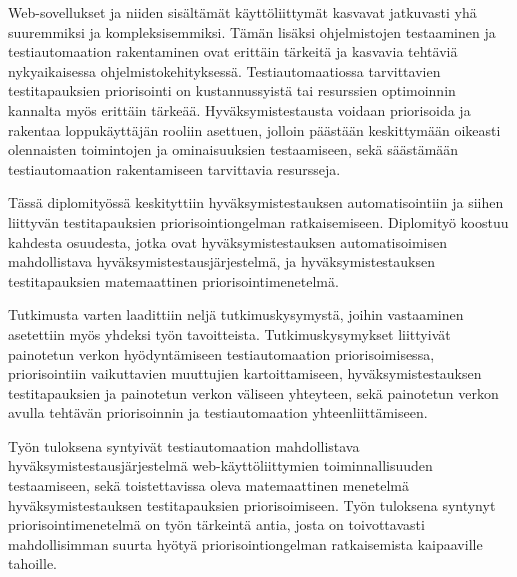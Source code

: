 Web-sovellukset ja niiden sisältämät käyttöliittymät kasvavat jatkuvasti yhä suuremmiksi ja kompleksisemmiksi.
Tämän lisäksi ohjelmistojen testaaminen ja testiautomaation rakentaminen ovat erittäin tärkeitä ja kasvavia tehtäviä nykyaikaisessa ohjelmistokehityksessä.
Testiautomaatiossa tarvittavien testitapauksien priorisointi on kustannussyistä tai resurssien optimoinnin kannalta myös erittäin tärkeää.
Hyväksymistestausta voidaan priorisoida ja rakentaa loppukäyttäjän rooliin asettuen, jolloin päästään keskittymään oikeasti olennaisten toimintojen ja ominaisuuksien testaamiseen, sekä säästämään testiautomaation rakentamiseen tarvittavia resursseja.

Tässä diplomityössä keskityttiin hyväksymistestauksen automatisointiin ja siihen liittyvän testitapauksien priorisointiongelman ratkaisemiseen.
Diplomityö koostuu kahdesta osuudesta, jotka ovat hyväksymistestauksen automatisoimisen mahdollistava hyväksymistestausjärjestelmä, ja hyväksymistestauksen testitapauksien matemaattinen priorisointimenetelmä.

Tutkimusta varten laadittiin neljä tutkimuskysymystä, joihin vastaaminen asetettiin myös yhdeksi työn tavoitteista.
Tutkimuskysymykset liittyivät painotetun verkon hyödyntämiseen testiautomaation priorisoimisessa, priorisointiin vaikuttavien muuttujien kartoittamiseen, hyväksymistestauksen testitapauksien ja painotetun verkon väliseen yhteyteen, sekä painotetun verkon avulla tehtävän priorisoinnin ja testiautomaation yhteenliittämiseen.

Työn tuloksena syntyivät testiautomaation mahdollistava hy\-väk\-sy\-mis\-tes\-taus\-jär\-jes\-tel\-mä web-käyt\-tö\-liit\-ty\-mien toiminnallisuuden testaamiseen, sekä toistettavissa oleva matemaattinen menetelmä hyväksymistestauksen testitapauksien priorisoimiseen.
Työn tuloksena syntynyt priorisointimenetelmä on työn tärkeintä antia, josta on toivottavasti mahdollisimman suurta hyötyä priorisointiongelman ratkaisemista kaipaaville tahoille.
